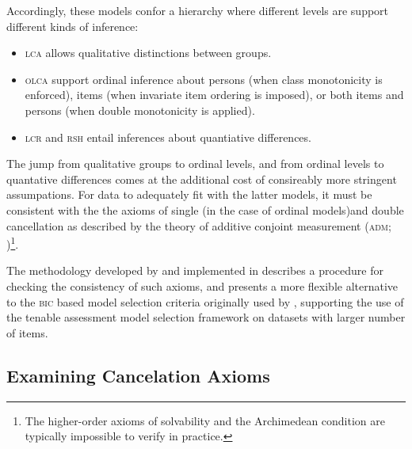 \documentclass[12pt]{article}
\begin{document}
Accordingly, these models confor a hierarchy where different levels are support different kinds of inference:

\begin{itemize}
	\item \textsc{lca} allows qualitative distinctions between groups.
	\item \textsc{olca} support ordinal inference about persons (when class monotonicity is enforced), items (when invariate item ordering is imposed), or both items and persons (when double monotonicity is applied).
	\item \textsc{lcr} and \textsc{rsh} entail inferences about quantiative differences.
\end{itemize}

The jump from qualitative groups to ordinal levels, and from ordinal levels to quantative differences comes at the additional cost of consireably more stringent assumpations. For data to adequately fit with the latter models, it must be consistent with the the axioms of single (in the case of ordinal models)and double cancellation as described by the theory of additive conjoint measurement (\textsc{adm}; )\footnote{The higher-order axioms of solvability and the Archimedean condition are typically impossible to verify in practice.}.

The methodology developed by  and implemented in  describes a procedure for checking the consistency of such axioms, and presents a more flexible alternative to the \textsc{bic} based model selection criteria originally used by , supporting the use of the tenable assessment model selection framework on datasets with larger number of items.

\subsection{Examining Cancelation Axioms}
\end{document}
